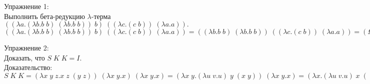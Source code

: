 \documentclass[a4paper,12pt, twoside]{article}
\begin{document}
Упражнение 1: \\
Выполнить бета-редукцию $\lambda$-терма $((\lambda a.(\lambda b.b\;b)\;(\lambda b.b\;b))\;b)\;((\lambda c.(c\;b))\;(\lambda a.a)).$ \\

$((\lambda a.(\lambda b.b\;b)\;(\lambda b.b\;b))\;b)\;((\lambda c.(c\;b))\;(\lambda a.a))=((\lambda b.b\;b)\;(\lambda b.b\;b))\;((\lambda c.(c\;b))\;(\lambda a.a))=(\Omega)\;((\lambda c.(c\;b))\;(\lambda a.a))=(\Omega)\;((\lambda a.a)\;b)=(\Omega)\;(b)=\Omega\;b$ \newline

Упражнение 2: \\
Доказать, что $S\;K\;K = I.$ \\
Доказательство: \\

$S\;K\;K = (\lambda x\;y\;z.x\;z\;(y\;z))\;(\lambda x\;y.x)\;(\lambda x\;y.x)=(\lambda x\;y.(\lambda u\;v.u)\;y\;(x\;y))\;(\lambda x\;y.x)=(\lambda x.(\lambda u\;v.u)\;x\;((\lambda p\;q.p)\;x))=\lambda x.(\lambda u\;v.u)\;x\;\lambda q.x=\lambda x.x=I$
\end{document}
